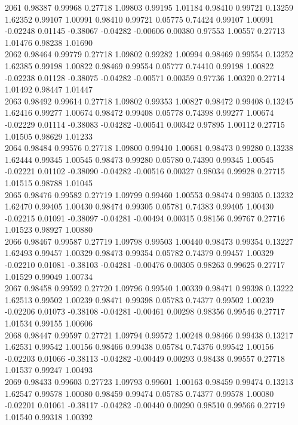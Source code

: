 {2061 0.98387 0.99968 0.27718 1.09803 0.99195 1.01184 0.98410 0.99721 0.13259 1.62352 0.99107 1.00991 0.98410 0.99721 0.05775 0.74424 0.99107 1.00991 -0.02248 0.01145 -0.38067 -0.04282 -0.00606 0.00380 0.97553 1.00557 0.27713 1.01476 0.98238 1.01690 \\
2062 0.98464 0.99779 0.27718 1.09802 0.99282 1.00994 0.98469 0.99554 0.13252 1.62385 0.99198 1.00822 0.98469 0.99554 0.05777 0.74410 0.99198 1.00822 -0.02238 0.01128 -0.38075 -0.04282 -0.00571 0.00359 0.97736 1.00320 0.27714 1.01492 0.98447 1.01447 \\
2063 0.98492 0.99614 0.27718 1.09802 0.99353 1.00827 0.98472 0.99408 0.13245 1.62416 0.99277 1.00674 0.98472 0.99408 0.05778 0.74398 0.99277 1.00674 -0.02229 0.01114 -0.38083 -0.04282 -0.00541 0.00342 0.97895 1.00112 0.27715 1.01505 0.98629 1.01233 \\
2064 0.98484 0.99576 0.27718 1.09800 0.99410 1.00681 0.98473 0.99280 0.13238 1.62444 0.99345 1.00545 0.98473 0.99280 0.05780 0.74390 0.99345 1.00545 -0.02221 0.01102 -0.38090 -0.04282 -0.00516 0.00327 0.98034 0.99928 0.27715 1.01515 0.98788 1.01045 \\
2065 0.98476 0.99582 0.27719 1.09799 0.99460 1.00553 0.98474 0.99305 0.13232 1.62470 0.99405 1.00430 0.98474 0.99305 0.05781 0.74383 0.99405 1.00430 -0.02215 0.01091 -0.38097 -0.04281 -0.00494 0.00315 0.98156 0.99767 0.27716 1.01523 0.98927 1.00880 \\
2066 0.98467 0.99587 0.27719 1.09798 0.99503 1.00440 0.98473 0.99354 0.13227 1.62493 0.99457 1.00329 0.98473 0.99354 0.05782 0.74379 0.99457 1.00329 -0.02210 0.01081 -0.38103 -0.04281 -0.00476 0.00305 0.98263 0.99625 0.27717 1.01529 0.99049 1.00734 \\
2067 0.98458 0.99592 0.27720 1.09796 0.99540 1.00339 0.98471 0.99398 0.13222 1.62513 0.99502 1.00239 0.98471 0.99398 0.05783 0.74377 0.99502 1.00239 -0.02206 0.01073 -0.38108 -0.04281 -0.00461 0.00298 0.98356 0.99546 0.27717 1.01534 0.99155 1.00606 \\
2068 0.98447 0.99597 0.27721 1.09794 0.99572 1.00248 0.98466 0.99438 0.13217 1.62531 0.99542 1.00156 0.98466 0.99438 0.05784 0.74376 0.99542 1.00156 -0.02203 0.01066 -0.38113 -0.04282 -0.00449 0.00293 0.98438 0.99557 0.27718 1.01537 0.99247 1.00493 \\
2069 0.98433 0.99603 0.27723 1.09793 0.99601 1.00163 0.98459 0.99474 0.13213 1.62547 0.99578 1.00080 0.98459 0.99474 0.05785 0.74377 0.99578 1.00080 -0.02201 0.01061 -0.38117 -0.04282 -0.00440 0.00290 0.98510 0.99566 0.27719 1.01540 0.99318 1.00392 \\
}
